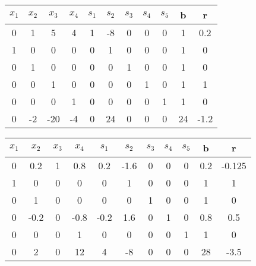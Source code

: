 \documentclass{article}
\begin{document}
\begin{center}
\begin{tabular}{|c|c|c|c|c|c|c|c|c|c|c|}
\hline
$x_1$  & $x_2$ & $x_3$  & $x_4$ & $s_1$ & $s_2$ & $s_3$ & $s_4$ & $s_5$ & b & r     \\ \hline
0\cellcolor{yellow!25}   & \cellcolor{yellow!25}1     & \cellcolor{pink!25}5      & \cellcolor{yellow!25}4  & \cellcolor{yellow!25}1  & \cellcolor{yellow!25}-8  & \cellcolor{yellow!25}0  & \cellcolor{yellow!25}0  & \cellcolor{yellow!25}0  & \cellcolor{yellow!25}1 & \cellcolor{yellow!25}0.2 \\ \hline
1   & 0     & \cellcolor{pink!25}0      & 0    & 0      & 1  & 0  & 0  & 0  & 1      & 0     \\ \hline
0  & 1      & \cellcolor{pink!25}0      & 0    & 0      & 0  & 1  & 0  & 0  & 1      & 0   \\ \hline
0  & 0      & \cellcolor{pink!25}1      & 0    & 0      & 0  & 0  & 1  & 0  & 1      & 1   \\ \hline
0  & 0      & \cellcolor{pink!25}0      & 1    & 0      & 0  & 0  & 0  & 1  & 1      & 0   \\ \hline
0 & -2      & \cellcolor{pink!25}-20 & -4 & 0  & 24  & 0  & 0  & 0  & 24 & -1.2     \\ \hline
\end{tabular}

\end{center}
\begin{center}
\begin{tabular}{|c|c|c|c|c|c|c|c|c|c|c|}
\hline
$x_1$  & $x_2$ & $x_3$  & $x_4$ & $s_1$ & $s_2$ & $s_3$ & $s_4$ & $s_5$ & b & r     \\ \hline
0  & 0.2     & 1      & 0.8  & 0.2  & \cellcolor{pink!25}-1.6  & 0  & 0  & 0  & 0.2 & -0.125 \\ \hline
1  & 0      & 0      & 0    & 0      &\cellcolor{pink!25} 1  & 0  & 0  & 0  & 1      & 1   \\ \hline
0  & 1      & 0      & 0    & 0      &\cellcolor{pink!25} 0  & 1  & 0  & 0  & 1      & 0   \\ \hline
0\cellcolor{yellow!25}  & \cellcolor{yellow!25}-0.2   & \cellcolor{yellow!25}0      & \cellcolor{yellow!25}-0.8 & \cellcolor{yellow!25}-0.2    &\cellcolor{pink!25}1.6  & \cellcolor{yellow!25}0  & \cellcolor{yellow!25}1  & \cellcolor{yellow!25}0  & \cellcolor{yellow!25}0.8      & \cellcolor{yellow!25}0.5   \\ \hline
0  & 0      & 0      & 1    & 0      &\cellcolor{pink!25} 0  & 0  & 0  & 1  & 1      & 0   \\ \hline
0  & 2      & 0      & 12   & 4      &\cellcolor{pink!25}-8  & 0  & 0  & 0  & 28 & -3.5    \\ \hline
\end{tabular}
\end{center}
\end{document}

